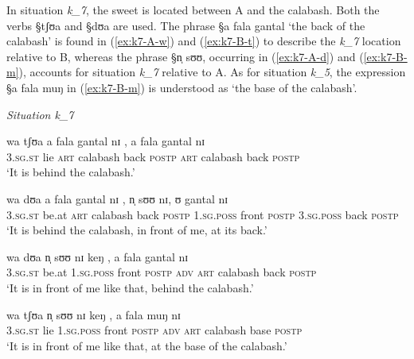 In situation {\it k_{7}}, the sweet is located between  A and the
calabash. Both the  verbs {\S tʃʊa} and {\S dʊa} are used. The phrase {\S a fala
gantal} `the back of the  calabash' is found in
(\ref{ex:k7-A-w}) and (\ref{ex:k7-B-t}) to
describe the  {\it k_{7}} location relative to B, whereas the phrase
{\S n̩ sʊʊ}, occurring in (\ref{ex:k7-A-d}) and (\ref{ex:k7-B-m}), accounts
for 
situation {\it k_{7}} relative to A.  As for situation {\it k_{5}}, the
expression {\S a fala muŋ}  in (\ref{ex:k7-B-m})  is
understood as  `the base of the calabash'. 




\begin{exe}
\ex\label{ex:k7}\textit{Situation {\it k_{7}}}\\
 \begin{xlist}
  

\ex\label{ex:k7-A-w}
\gll wa tʃʊa a fala gantal nɪ , a fala gantal nɪ \\
\textsc{3.sg.st} lie \textsc{art} calabash back \textsc{postp} {}  \textsc{art}
calabash back  \textsc{postp}\\
\glt `It is behind the calabash.'

\ex\label{ex:k7-A-d}
\gll wa dʊa a fala gantal nɪ , n̩ sʊʊ nɪ, ʊ gantal nɪ\\
\textsc{3.sg.st} be.at \textsc{art} calabash back \textsc{postp} {}
\textsc{1.sg.poss} front \textsc{postp}  \textsc{3.sg.poss} back \textsc{postp}
\\
\glt `It is behind the calabash, in front of me, at its back.'

\ex\label{ex:k7-B-t}


\gll wa dʊa n̩ sʊʊ nɪ keŋ , a fala gantal nɪ\\
\textsc{3.sg.st}  be.at \textsc{1.sg.poss} front \textsc{postp} \textsc{adv} {} 
\textsc{art} calabash back  \textsc{postp} \\
\glt `It is in front of me like that, behind the calabash.'


\ex\label{ex:k7-B-m}
\gll wa tʃʊa n̩ sʊʊ nɪ keŋ , a fala muŋ nɪ\\
\textsc{3.sg.st} lie \textsc{1.sg.poss} front \textsc{postp} \textsc{adv} {}
\textsc{art} calabash  base \textsc{postp}\\
\glt  `It is in front of me like that,  at the base of the calabash.'

 \end{xlist}

\end{exe}




